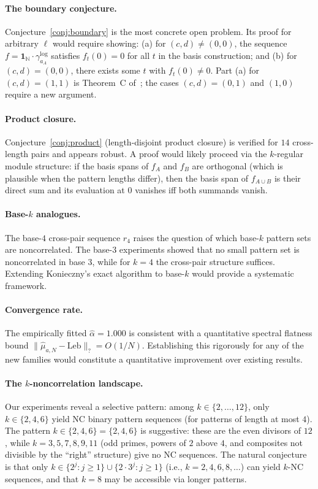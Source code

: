 \documentclass[11pt]{article}
\theoremstyle{definition}
\newcommand{\Leb}{\mathrm{Leb}}
\newcommand{\N}{\mathbb{N}}
\begin{document}
\paragraph{The boundary conjecture.}
Conjecture~\ref{conj:boundary} is the most concrete open problem.
Its proof for arbitrary $\ell$ would require showing:
(a) for $(c,d) \neq (0,0)$, the sequence $f = \mathbf{1}_\N \cdot
\gamma^{\log}_{a_A}$ satisfies $f_t(0) = 0$ for all $t$
in the basis construction; and
(b) for $(c,d) = (0,0)$, there exists some $t$ with $f_t(0) \neq 0$.
Part (a) for $(c,d) = (1,1)$ is Theorem~C of~\cite{Kon21}; the cases
$(c,d) = (0,1)$ and $(1,0)$ require a new argument.

\paragraph{Product closure.}
Conjecture~\ref{conj:product} (length-disjoint product closure) is
verified for $14$ cross-length pairs and appears robust. A proof
would likely proceed via the $k$-regular module structure: if the
basis spans of $f_A$ and $f_B$ are orthogonal (which is plausible
when the pattern lengths differ), then the basis span of $f_{A\cup B}$
is their direct sum and its evaluation at $0$ vanishes iff both
summands vanish.

\paragraph{Base-$k$ analogues.}
The base-$4$ cross-pair sequence $r_4$ raises the question of which
base-$k$ pattern sets are noncorrelated. The base-$3$ experiments
showed that no small pattern set is noncorrelated in base $3$, while
for $k = 4$ the cross-pair structure suffices. Extending Konieczny's
exact algorithm to base-$k$ would provide a systematic framework.

\paragraph{Convergence rate.}
The empirically fitted $\hat\alpha = 1.000$ is consistent with a
quantitative spectral flatness bound
$\|\hat\mu_{a,N} - \Leb\|_? = O(1/N)$.
Establishing this rigorously for any of the new families would
constitute a quantitative improvement over existing results.

\paragraph{The $k$-noncorrelation landscape.}
Our experiments reveal a selective pattern: among $k \in \{2,\ldots,12\}$,
only $k \in \{2, 4, 6\}$ yield NC binary pattern sequences (for patterns
of length at most $4$).  The pattern $k \in \{2, 4, 6\} = \{2, 4, 6\}$
is suggestive: these are the even divisors of $12$, while $k = 3, 5, 7,
8, 9, 11$ (odd primes, powers of $2$ above $4$, and composites not
divisible by the ``right'' structure) give no NC sequences.
The natural conjecture is that only $k \in \{2^j : j \geq 1\} \cup
\{2 \cdot 3^j : j \geq 1\}$ (i.e., $k = 2, 4, 6, 8, \ldots$) can
yield $k$-NC sequences, and that $k = 8$ may be accessible via longer
patterns.
\end{document}
